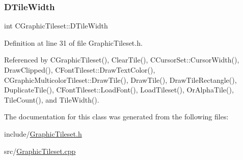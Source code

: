 \hypertarget{classCGraphicTileset_a2d0c7d19865b81911a3a43d5cae50e00}{}\label{classCGraphicTileset_a2d0c7d19865b81911a3a43d5cae50e00} 
\subsubsection{\texorpdfstring{D\+Tile\+Width}{DTileWidth}}
{\footnotesize\ttfamily int C\+Graphic\+Tileset\+::\+D\+Tile\+Width\hspace{0.3cm}{\ttfamily [protected]}}



Definition at line 31 of file Graphic\+Tileset.\+h.



Referenced by C\+Graphic\+Tileset(), Clear\+Tile(), C\+Cursor\+Set\+::\+Cursor\+Width(), Draw\+Clipped(), C\+Font\+Tileset\+::\+Draw\+Text\+Color(), C\+Graphic\+Multicolor\+Tileset\+::\+Draw\+Tile(), Draw\+Tile(), Draw\+Tile\+Rectangle(), Duplicate\+Tile(), C\+Font\+Tileset\+::\+Load\+Font(), Load\+Tileset(), Or\+Alpha\+Tile(), Tile\+Count(), and Tile\+Width().



The documentation for this class was generated from the following files\+:\begin{DoxyCompactItemize}
\item 
include/\hyperlink{GraphicTileset_8h}{Graphic\+Tileset.\+h}\item 
src/\hyperlink{GraphicTileset_8cpp}{Graphic\+Tileset.\+cpp}\end{DoxyCompactItemize}
